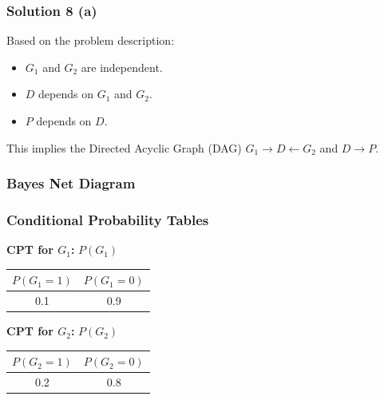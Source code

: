\documentclass{article}
\begin{document}
\subsubsection*{Solution 8 (a)}
Based on the problem description:
\begin{itemize}
    \item $G_1$ and $G_2$ are independent.
    \item $D$ depends on $G_1$ and $G_2$.
    \item $P$ depends on $D$.
\end{itemize}
This implies the Directed Acyclic Graph (DAG) $G_1 \to D \leftarrow G_2$ and $D \to P$.

\subsubsection*{Bayes Net Diagram}

    \begin{center}
    \end{center}

\subsubsection*{Conditional Probability Tables}
\textbf{CPT for $G_1$:} $P(G_1)$
\begin{center}
\begin{tabular}{c c}
\toprule
$P(G_1=1)$ & $P(G_1=0)$ \\
\midrule
0.1 & 0.9 \\
\bottomrule
\end{tabular}
\end{center}

\textbf{CPT for $G_2$:} $P(G_2)$
\begin{center}
\begin{tabular}{c c}
\toprule
$P(G_2=1)$ & $P(G_2=0)$ \\
\midrule
0.2 & 0.8 \\
\bottomrule
\end{tabular}
\end{center}
\end{document}
